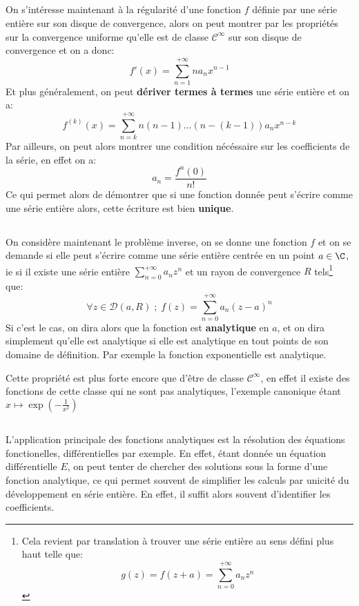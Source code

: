 \subsection*{}
On s'intéresse maintenant à la régularité d'une fonction \(f\) définie par une série entière sur son disque de convergence, alors on peut montrer par les propriétés sur la convergence uniforme qu'elle est de classe \(\mathcal{C}^\infty\) sur son disque de convergence et on a donc:
\[
   f'(x) = \sum_{n=1}^{+\infty} na_nx^{n-1}  
\]
Et plus généralement, on peut \textbf{dériver termes à termes} une série entière et on a:
\[
   f^{(k)}(x) = \sum_{n=k}^{+\infty} n(n-1)\ldots(n-(k-1))a_nx^{n-k}  
\]
Par ailleurs, on peut alors montrer une condition nécéssaire sur les coefficients de la série, en effet on a:
\[
   a_n = \frac{f^n(0)}{n!}   
\]
Ce qui permet alors de démontrer que si une fonction donnée peut s'écrire comme une série entière alors, cette écriture est bien \textbf{unique}. 
\subsection*{}
On considère maintenant le problème inverse, on se donne une fonction \(f\) et on se demande si elle peut s'écrire comme une série entière centrée en un point \(a \in \C\), ie si il existe une série entière \(\sum_{n=0}^{+\infty} a_nz^n\) et un rayon de convergence \(R\) tels\footnote[1]{Cela revient par translation à trouver une série entière au sens défini plus haut telle que:
\[
   g(z) = f(z + a) = \sum_{n=0}^{+\infty} a_nz^n
\]} que:
\[
   \forall z \in \mathcal{D}(a, R) \; ; \; f(z) = \sum_{n=0}^{+\infty} a_n(z - a)^{n}  
\]
Si c'est le cas, on dira alors que la fonction est \textbf{analytique} en \(a\), et on dira simplement qu'elle est analytique si elle est analytique en tout points de son domaine de définition. Par exemple la fonction exponentielle est analytique.\<

Cette propriété est plus forte encore que d'être de classe \(\mathcal{C}^\infty\), en effet il existe des fonctions de cette classe qui ne sont pas analytiques, l'exemple canonique étant \(x \mapsto \exp(-\frac{1}{x^2})\)

\subsection*{}
L'application principale des fonctions analytiques est la résolution des équations fonctionelles, différentielles par exemple. En effet, étant donnée un équation différentielle \(E\), on peut tenter de chercher des solutions sous la forme d'une fonction analytique, ce qui permet souvent de simplifier les calculs par unicité du développement en série entière. En effet, il suffit alors souvent d'identifier les coefficients.\<

